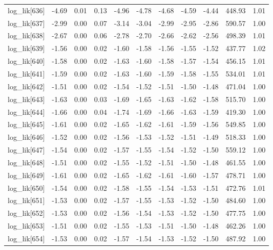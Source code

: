 \begin{table}[ht]
\begin{tabular}{rrrrrrrrrrr}
  log\_lik[636] & -4.69 & 0.01 & 0.13 & -4.96 & -4.78 & -4.68 & -4.59 & -4.44 & 448.93 & 1.01 \\ 
  log\_lik[637] & -2.99 & 0.00 & 0.07 & -3.14 & -3.04 & -2.99 & -2.95 & -2.86 & 590.57 & 1.00 \\ 
  log\_lik[638] & -2.67 & 0.00 & 0.06 & -2.78 & -2.70 & -2.66 & -2.62 & -2.56 & 498.39 & 1.01 \\ 
  log\_lik[639] & -1.56 & 0.00 & 0.02 & -1.60 & -1.58 & -1.56 & -1.55 & -1.52 & 437.77 & 1.02 \\ 
  log\_lik[640] & -1.58 & 0.00 & 0.02 & -1.63 & -1.60 & -1.58 & -1.57 & -1.54 & 456.15 & 1.01 \\ 
  log\_lik[641] & -1.59 & 0.00 & 0.02 & -1.63 & -1.60 & -1.59 & -1.58 & -1.55 & 534.01 & 1.01 \\ 
  log\_lik[642] & -1.51 & 0.00 & 0.02 & -1.54 & -1.52 & -1.51 & -1.50 & -1.48 & 471.04 & 1.00 \\ 
  log\_lik[643] & -1.63 & 0.00 & 0.03 & -1.69 & -1.65 & -1.63 & -1.62 & -1.58 & 515.70 & 1.00 \\ 
  log\_lik[644] & -1.66 & 0.00 & 0.04 & -1.74 & -1.69 & -1.66 & -1.63 & -1.59 & 419.30 & 1.00 \\ 
  log\_lik[645] & -1.61 & 0.00 & 0.02 & -1.65 & -1.62 & -1.61 & -1.59 & -1.56 & 549.85 & 1.00 \\ 
  log\_lik[646] & -1.52 & 0.00 & 0.02 & -1.56 & -1.53 & -1.52 & -1.51 & -1.49 & 518.33 & 1.00 \\ 
  log\_lik[647] & -1.54 & 0.00 & 0.02 & -1.57 & -1.55 & -1.54 & -1.52 & -1.50 & 559.12 & 1.00 \\ 
  log\_lik[648] & -1.51 & 0.00 & 0.02 & -1.55 & -1.52 & -1.51 & -1.50 & -1.48 & 461.55 & 1.00 \\ 
  log\_lik[649] & -1.61 & 0.00 & 0.02 & -1.65 & -1.62 & -1.61 & -1.60 & -1.57 & 478.71 & 1.00 \\ 
  log\_lik[650] & -1.54 & 0.00 & 0.02 & -1.58 & -1.55 & -1.54 & -1.53 & -1.51 & 472.76 & 1.01 \\ 
  log\_lik[651] & -1.53 & 0.00 & 0.02 & -1.57 & -1.55 & -1.53 & -1.52 & -1.50 & 484.60 & 1.00 \\ 
  log\_lik[652] & -1.53 & 0.00 & 0.02 & -1.56 & -1.54 & -1.53 & -1.52 & -1.50 & 477.75 & 1.00 \\ 
  log\_lik[653] & -1.51 & 0.00 & 0.02 & -1.55 & -1.53 & -1.51 & -1.50 & -1.48 & 462.26 & 1.00 \\ 
  log\_lik[654] & -1.53 & 0.00 & 0.02 & -1.57 & -1.54 & -1.53 & -1.52 & -1.50 & 487.92 & 1.00 \\ 

\end{tabular}
\end{table}
